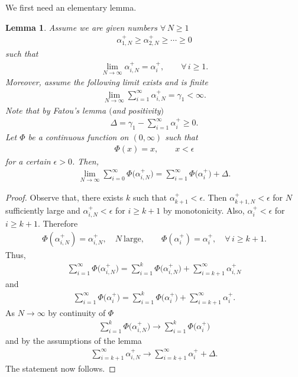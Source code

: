 \documentclass[pdftex]{sigma}
\numberwithin{equation}{section}
\newtheorem{Lemma}[Theorem]{Lemma}
\begin{document}
We first need an elementary lemma.
\begin{Lemma}Assume we are given numbers $\forall\, N \ge 1$
\begin{gather*}
\alpha_{1,N}^+\ge \alpha_{2,N}^+\ge \cdots \ge 0
\end{gather*}
such that
\begin{gather*}
\lim_{N \to \infty}\alpha_{i,N}^+=\alpha_i^+, \qquad \forall\, i\ge 1.
\end{gather*}
Moreover, assume the following limit exists and is finite
\begin{gather*}
\lim_{N\to \infty} \sum_{i=1}^{\infty}\alpha_{i,N}^+=\gamma_1<\infty.
\end{gather*}
Note that by Fatou's lemma $($and positivity$)$
\begin{gather*}
\Delta=\gamma_1-\sum_{i=1}^{\infty}\alpha_i^+\ge 0.
\end{gather*}
Let $\Phi$ be a continuous function on $(0,\infty)$ such that
\begin{gather*}
\Phi(x)=x, \qquad x<\epsilon
\end{gather*}
for a certain $\epsilon>0$. Then,
\begin{gather*}
\lim_{N \to \infty}\sum_{i=0}^{\infty} \Phi\big(\alpha_{i,N}^+\big)=\sum_{i=1}^{\infty} \Phi\big(\alpha_i^+\big)+\Delta.
\end{gather*}
\end{Lemma}

\begin{proof}Observe that, there exists $k$ such that $\alpha_{k+1}^{+}<\epsilon$. Then $\alpha_{k+1,N}^+<\epsilon$ for $N$ sufficiently large and $\alpha_{i,N}^+<\epsilon$ for $i\ge k+1$ by monotonicity. Also, $\alpha_i^+<\epsilon$ for $i\ge k+1$. Therefore
\begin{gather*}
\Phi(\alpha_{i,N}^+)=\alpha_{i,N}^+, \quad N \ \text{large},\qquad \Phi(\alpha_{i}^+)=\alpha_{i}^+, \quad \forall\, i \ge k+1.
\end{gather*}
Thus,
\begin{gather*}
\sum_{i=1}^{\infty}\Phi\big(\alpha_{i,N}^+\big)=\sum_{i=1}^{k}\Phi\big(\alpha_{i,N}^+\big)+\sum_{i=k+1}^{\infty}\alpha_{i,N}^+
\end{gather*}
and
\begin{gather*}
\sum_{i=1}^{\infty}\Phi\big(\alpha_{i}^+\big)=\sum_{i=1}^{k}\Phi\big(\alpha_{i}^+\big)+\sum_{i=k+1}^{\infty}\alpha_{i}^+.
\end{gather*}
As $N \to \infty$ by continuity of $\Phi$
\begin{gather*}
\sum_{i=1}^{k}\Phi\big(\alpha_{i,N}^+\big) \to \sum_{i=1}^{k}\Phi\big(\alpha_{i}^+\big)
\end{gather*}
and by the assumptions of the lemma
\begin{gather*}
\sum_{i=k+1}^{\infty}\alpha_{i,N}^+\to \sum_{i=k+1}^{\infty}\alpha_{i}^++\Delta.
\end{gather*}
The statement now follows.
\end{proof}
\end{document}
